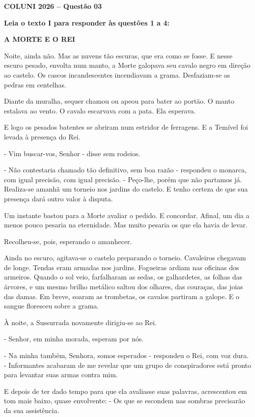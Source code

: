 \textbf{COLUNI 2026 -- Questão 03}\par\medskip \textbf{Leia o texto I para responder às questões 1 a 4:}

\begin{center}\textbf{A MORTE E O REI}\end{center}

Noite, ainda não. Mas as nuvens tão escuras, que era como se fosse. E nesse escuro pesado, envolta num manto, a Morte galopava seu cavalo negro em direção ao castelo. Os cascos incandescentes incendiavam a grama. Desfaziam-se as pedras em centelhas.

Diante da muralha, sequer chamou ou apeou para bater ao portão. O manto estalava ao vento. O cavalo escarvava com a pata. Ela esperava.

E logo os pesados batentes se abriram num estridor de ferragens. E a Temível foi levada à presença do Rei.

- Vim buscar-vos, Senhor - disse sem rodeios.

- Não contestaria chamado tão definitivo, sem boa razão - respondeu o monarca, com igual precisão, com igual precisão. - Peço-lhe, porém que não partamos já. Realiza-se amanhã um torneio nos jardins do castelo. E tenho certeza de que sua presença dará outro valor à disputa.

Um instante bastou para a Morte avaliar o pedido. E concordar. Afinal, um dia a menos pouco pesaria na eternidade. Mas muito pesaria os que ela havia de levar.

Recolheu-se, pois, esperando o amanhecer.

Ainda no escuro, agitava-se o castelo preparando o torneio. Cavaleiros chegavam de longe. Tendas eram armadas nos jardins. Fogueiras ardiam nas oficinas dos armeiros. Quando o sol veio, farfalharam as sedas, os galhardetes, as folhas das árvores, e um mesmo brilho metálico saltou dos olhares, das couraças, das joias das damas. Em breve, soaram as trombetas, os cavalos partiram a galope. E o sangue floresceu sobre a grama.

À noite, a Sussurrada novamente dirigiu-se ao Rei.

- Senhor, em minha morada, esperam por nós.

- Na minha também, Senhora, somos esperados - respondeu o Rei, com voz dura. - Informantes acabaram de me revelar que um grupo de conspiradores está pronto para levantar suas armas contra mim.

E depois de ter dado tempo para que ela avaliasse suas palavras, acrescentou em tom mais baixo, quase envolvente: - Os que se escondem nas sombras precisarão da sua assistência.

